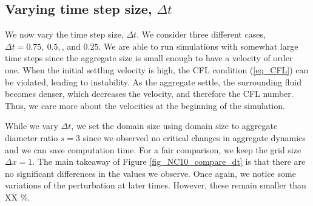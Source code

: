 \subsection{Varying time step size, $\Delta t$}
We now vary the time step size, $\Delta t$. We consider three different cases, $\Delta t = 0.75, \ 0.5, $, and $0.25$. We are able to run simulations with somewhat large time steps since the aggregate size is small enough to have a velocity of order one. When the initial settling velocity is high, the CFL condition (\ref{eq_CFL}) can be violated, leading to instability. As the aggregate settle, the surrounding fluid becomes denser, which decreases the velocity, and therefore the CFL number. Thus, we care more about the velocities at the beginning of the simulation. 
\par
While we vary $\Delta t$, we set the domain size using domain size to aggregate diameter ratio $s = 3$ since we observed no critical changes in aggregate dynamics and we can save computation time. For a fair comparison, we keep the grid size $\Delta x =1$. 
The main takeaway of Figure \ref{fig_NC10_compare_dt} is that there are no significant differences in the values we observe. Once again, we notice some variations of the perturbation at later times. 
However, these remain smaller than XX \%.
